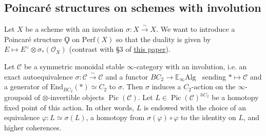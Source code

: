 \documentclass{article}
\DeclareMathOperator{\Cat}{\mathcal{C}at} %
\DeclareMathOperator{\Catex}{\Cat_\infty^{ex}} %
\DeclareMathOperator{\Pic}{Pic} %
\renewcommand{\phi}{\varphi}
\newcommand{\EE}{\mathbb{E}}
\newcommand{\perf}{\mathrm{Perf}}
\theoremstyle{definition}
\begin{document}
\subsection{Poincaré structures on schemes with involution}
Let $ X $ be a scheme with an involution $ \sigma \colon X \xrightarrow{\sim} X $. 
We want to introduce a Poincaré structure $ \Qoppa $ on $ \perf(X) $ so that the duality is given by $ E \mapsto E^\vee \otimes \sigma_*(\mathcal{O}_X) $ (contrast with \S3 of \href{https://arxiv.org/abs/2402.15136}{this paper}). 

Let $ \mathcal{C} $ be a symmetric monoidal stable $\infty $-category with an involution, i.e. an exact autoequivalence $ \sigma \colon \mathcal{C} \xrightarrow{\sim} \mathcal{C} $ and a functor $ BC_2 \to \EE_\infty \mathrm{Alg} \Catex $ sending $ * \mapsto \mathcal{C} $ and a generator of $ \mathrm{End}_{BC_2}(*) \simeq C_2 $ to $ \sigma $. 
Then $ \sigma $ induces a $ C_2 $-action on the $ \infty $-groupoid of $ \otimes $-invertible objects $ \Pic(\mathcal{C}) $. 
Let $ L \in \Pic(\mathcal{C})^{hC_2} $ be a homotopy fixed point of this action. 
In other words, $ L $ is endowed with the choice of an equivalence $ \phi \colon L \simeq \sigma(L) $, a homotopy from $ \sigma(\phi) \circ \phi $ to the identity on $ L $, and higher coherences. 
\end{document}
